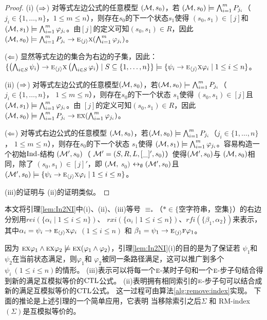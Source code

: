 \begin{proof}
	(i) ($\Rightarrow$) 对等式左边公式的任意模型 $({\cal M},s_0)$，若 $({\cal M},s_0) \models \bigwedge_{i=1}^m P_{j_i}$（ $j_i \in \{1, \dots, n\}$，$1\leq m \leq n$），则存在$s_0$的下一个状态$s_1$使得 $(s_0, s_1) \in [j]$和 $({\cal M}, s_1) \models \bigwedge_{i=1}^m \varphi_{j_i}$。由$[j]$的定义可知$(s_0, s_1) \in R$，因此$({\cal M}, s_0) \models \bigwedge_{i=1}^m P_{j_i} \rightarrow \textsc{e}_{{\langle{j}\rangle}} \textsc{x} (\bigwedge_{i=1}^m \varphi_{j_i})$。 %
	
	($\Leftarrow$)  显然等式左边的集合为右边的子集，因此：
	$\{\left(\bigwedge_{i\in S}\psi_i\right)\rightarrow \textsc{e}_{{\langle{j}\rangle}} \textsc{x} \left(\bigwedge_{i\in S}\varphi_i\right)\mid S\subseteq\{1,\dots, n\}\} \models \{\psi_i\rightarrow \textsc{e}_{{\langle{j}\rangle}} \textsc{x} \varphi_i \mid 1\le i\le n\}$。
	
	(ii) ($\Rightarrow$) 对等式左边公式的任意模型$({\cal M},s_0)$，若$({\cal M},s_0) \models \bigwedge_{i=1}^m P_{j_i}$（$j_i \in \{1, \dots, n\}$， $1\leq m \leq n$），则存在$s_0$的下一个状态 $s_1$使得 $(s_0, s_1) \in [j]$且$({\cal M}, s_1) \models \bigwedge_{i=1}^m \varphi_{j_i}$。由 $[j]$的定义可知$(s_0, s_1) \in R$，因此$({\cal M}, s_0) \models \bigwedge_{i=1}^m P_{j_i} \rightarrow \textsc{e} \textsc{x} (\bigwedge_{i=1}^m \varphi_{j_i})$。 %
	
	($\Leftarrow$) 对等式右边公式的任意模型 $({\cal M},s_0)$，若$({\cal M},s_0) \models \bigwedge_{i=1}^m P_{j_i}$（$j_i \in \{1, \dots, n\}$， $1\leq m \leq n$），则存在$s_0$的下一个状态 $s_1$使得 $({\cal M}, s_1) \models \bigwedge_{i=1}^m \varphi_{j_i}$。容易构造一个初始$\textrm{Ind}$-结构 $({\cal M}',s_0)$（ ${\cal M}'=(S,R,L,[\_]',s_0)$）使得$({\cal M}', s_0)$与 $({\cal M}, s_0)$相同，除了 $(s_0, s_1) \in [j]'$，即 $({\cal M},$ $s_0)$ $\leftrightarrow_{\emptyset} ({\cal M}', s_0)$且 $({\cal M}',s_0) \models \{\psi_i\rightarrow \textsc{e}_{{\langle{j}\rangle}} \textsc{x} \varphi_i \mid 1\le i\le n\}$。 
	
	(iii)的证明与 (ii)的证明类似。
\end{proof}


本文将引理\ref{lem:In2NI}中(i)、(ii)、(iii)等号 $\equiv_*$（$* \in \{$空字符串，空集$\}$）的右边分别用$rei(\{\alpha_i\mid 1\le i\le n\})$、
$rxi(\{\alpha_i\mid 1\le i\le n\})$、$rfi(\{\beta_1,\alpha_2\})$来表示，其中$\alpha_i=\psi_i\rightarrow \textsc{e}_{{\langle{j}\rangle}} \textsc{x} \varphi_i$ $(1\le i\le n)$ 和 $\beta_1=\psi_1 \rightarrow \textsc{e}_{{\langle{j}\rangle}}\textsc{f} \varphi_1$。



因为 $\textsc{e}\textsc{x}\varphi_1\land \textsc{e}\textsc{x}\varphi_2\not\models \textsc{e}\textsc{x}(\varphi_1\land\varphi_2)$，引理\ref{lem:In2NI}(i)的目的是为了保证若 $\psi_1$和 $\psi_2$在当前状态满足，则$\varphi_1$和 $\varphi_2$被同一条路径满足，这可以推广到多个 $\psi_i~(1\le i\le n)$的情形。 
(iii)表示可以将每一个$\textsc{e}$-某时子句和一个$\textsc{e}$-步子句结合得到新的满足互模拟等价的$\textrm{CTL}$公式。
(ii)表明拥有相同索引的$\textsc{e}$-步子句可以结合成新的满足互模拟等价的$\textrm{CTL}$公式。
这一过程可由算法\ref{alg:remove:index}实现。
下面的推论是上述引理的一个简单应用，它表明 当移除索引之后$\Sigma$ 和 RM-index$(\Sigma)$是互模拟等价的。

